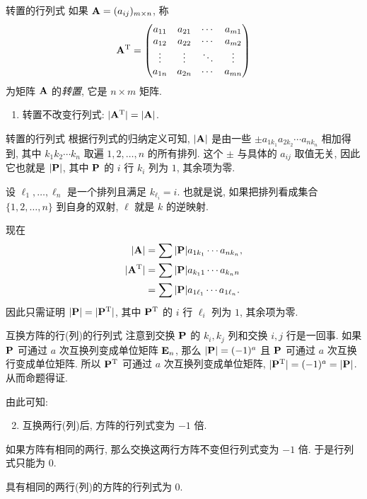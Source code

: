 \begin{frame}{转置的行列式}
	\onslide<+->
	如果 ${\mathbf{A}}=(a_{ij})_{m\times n}$, 称
	\[{\mathbf{A}}^{\mathrm{T}}=\begin{pmatrix}
		a_{11}&a_{21}&\cdots&a_{m1}\\
		a_{12}&a_{22}&\cdots&a_{m2}\\
		\vdots&\vdots&\ddots&\vdots\\
		a_{1n}&a_{2n}&\cdots&a_{mn}
	\end{pmatrix}\]
	为矩阵 ${\mathbf{A}}$ 的\emph{转置}, 它是 $n\times m$ 矩阵.
	\onslide<+->
	\begin{alertblock@}
		\begin{enumerate}
			\item 转置不改变行列式: $|{\mathbf{A}}^{\mathrm{T}}|=|{\mathbf{A}}|$.
		\end{enumerate}
	\end{alertblock@}
\end{frame}


\begin{frame}{转置的行列式}
	\onslide<+->
	根据行列式的归纳定义可知, $|{\mathbf{A}}|$ 是由一些 $\pm a_{1 k_1}a_{2 k_2}\cdots a_{n k_n}$ 相加得到, 其中 $k_1 k_2 \cdots k_n$ 取遍 $1,2,\dots,n$ 的所有排列.
	\onslide<+->
	这个 $\pm$ 与具体的 $a_{ij}$ 取值无关, 因此它也就是 $|{\mathbf{P}}|$, 其中 ${\mathbf{P}}$ 的 $i$ 行 $k_i$ 列为 $1$, 其余项为零.

	\onslide<+->
	设 $\ell_1,\dots,\ell_n$ 是一个排列且满足 $k_{\ell_i}=i$.
	\onslide<+->
	也就是说, 如果把排列看成集合 $\{1,2,\dots,n\}$ 到自身的双射, $\ell$ 就是 $k$ 的逆映射.

	\onslide<+->
	现在
	\begin{align*}
		|{\mathbf{A}}|&=\sum|{\mathbf{P}}| a_{1k_1}\cdots a_{nk_n},\\
		|{\mathbf{A}}^{\mathrm{T}}|&=\sum|{\mathbf{P}}| a_{k_1 1}\cdots a_{k_n n}\\
		&=\sum|{\mathbf{P}}| a_{1\ell_1}\cdots a_{1 \ell_n}.
	\end{align*}
	\onslide<+->
	因此只需证明 $|{\mathbf{P}}|=|{\mathbf{P}}^{\mathrm{T}}|$, 其中 ${\mathbf{P}}^{\mathrm{T}}$ 的 $i$ 行 $\ell_i$ 列为 $1$, 其余项为零.
\end{frame}


\begin{frame}{互换方阵的行(列)的行列式}
	\onslide<+->
	注意到交换 ${\mathbf{P}}$ 的 $k_i,k_j$ 列和交换 $i,j$ 行是一回事.
	\onslide<+->
	如果 ${\mathbf{P}}$ 可通过 $a$ 次互换列变成单位矩阵 ${\mathbf{E}}_n$, 那么 $|{\mathbf{P}}|=(-1)^a$ 且 ${\mathbf{P}}$ 可通过 $a$ 次互换行变成单位矩阵.
	\onslide<+->
	所以 ${\mathbf{P}}^{\mathrm{T}}$ 可通过 $a$ 次互换列变成单位矩阵, $|{\mathbf{P}}^{\mathrm{T}}|=(-1)^a=|{\mathbf{P}}|$.
	从而命题得证.
	
	\onslide<+->
	由此可知:
	\onslide<+->
	\begin{alertblock@}
	\begin{enumerate}
		\setcounter{enumi}{1}
		\item 互换两行(列)后, 方阵的行列式变为 $-1$ 倍.
	\end{enumerate}
	\end{alertblock@}
	\onslide<+->
	如果方阵有相同的两行, 那么交换这两行方阵不变但行列式变为 $-1$ 倍.
	\onslide<+->
	于是行列式只能为 $0$.
	\onslide<+->
	\begin{corollary}
		具有相同的两行(列)的方阵的行列式为 $0$.
	\end{corollary}
\end{frame}


